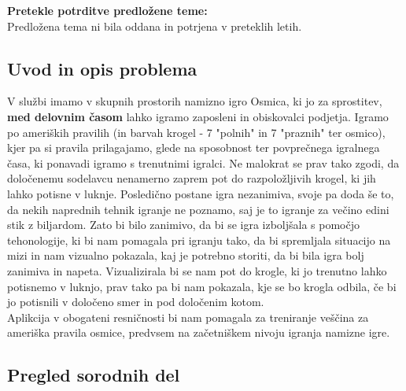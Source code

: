 \documentclass[a4paper, 12pt]{article}
\newcommand\cmnt[1]{\textcolor{munsell}{#1}}
\begin{document}
\textbf{Pretekle potrditve predložene teme:}\\
Predložena tema ni bila oddana in potrjena v preteklih letih.

\newpage
\subsection{Uvod in opis problema}

V službi imamo v skupnih prostorih namizno igro Osmica, ki jo za sprostitev, \textbf{med delovnim časom} lahko igramo
zaposleni in obiskovalci podjetja. Igramo po ameriških pravilih (in barvah krogel - 7 "polnih" in 7 "praznih" ter osmico), kjer pa si
pravila prilagajamo, glede na sposobnost ter povprečnega igralnega časa, ki ponavadi igramo s trenutnimi igralci. Ne malokrat se prav tako
zgodi, da določenemu sodelavcu nenamerno zaprem pot do razpoložljivih krogel, ki jih lahko potisne v luknje. Posledično postane igra
nezanimiva, svoje pa doda še to, da nekih naprednih tehnik igranje ne poznamo, saj je to igranje za večino edini stik z biljardom. 
Zato bi bilo zanimivo, da bi se igra izboljšala s pomočjo tehonologije, ki bi nam pomagala pri igranju tako, da bi spremljala situacijo na
mizi in nam vizualno pokazala, kaj je potrebno storiti, da bi bila igra bolj zanimiva in napeta. Vizualizirala bi se nam pot do 
krogle, ki jo trenutno lahko potisnemo v luknjo, prav tako pa bi nam pokazala, kje se bo krogla odbila, 
če bi jo potisnili v določeno smer in pod določenim kotom.  \\
Aplikcija v obogateni resničnosti bi nam pomagala za treniranje veščina za ameriška pravila osmice, predvsem na začetniškem nivoju igranja
namizne igre. 

\subsection{Pregled sorodnih del}
\end{document}
